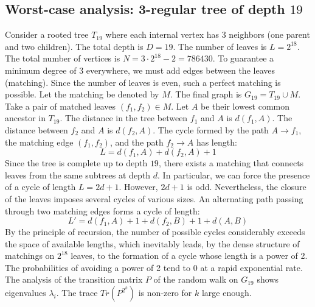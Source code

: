 \documentclass[11pt,a4paper]{article}
\begin{document}
\subsection{Worst-case analysis: 3-regular tree of depth $19$}
Consider a rooted tree $T_{19}$ where each internal vertex has 3 neighbors (one parent and two children).
The total depth is $D = 19$.
The number of leaves is $L = 2^{18}$.
The total number of vertices is $N = 3 \cdot 2^{18} - 2 = 786430$.
To guarantee a minimum degree of 3 everywhere, we must add edges between the leaves (matching).
Since the number of leaves is even, such a perfect matching is possible.
Let the matching be denoted by $M$. The final graph is $G_{19} = T_{19} \cup M$.
Take a pair of matched leaves $(f_1, f_2) \in M$.
Let $A$ be their lowest common ancestor in $T_{19}$.
The distance in the tree between $f_1$ and $A$ is $d(f_1, A)$.
The distance between $f_2$ and $A$ is $d(f_2, A)$.
The cycle formed by the path $A \to f_1$, the matching edge $(f_1, f_2)$, and the path $f_2 \to A$ has length:
$$ L = d(f_1, A) + d(f_2, A) + 1 $$
Since the tree is complete up to depth $19$, there exists a matching that connects leaves from the same subtrees at depth $d$.
In particular, we can force the presence of a cycle of length $L = 2d + 1$. However, $2d+1$ is odd.
Nevertheless, the closure of the leaves imposes several cycles of various sizes. An alternating path passing through two matching edges forms a cycle of length:
$$ L' = d(f_1, A) + 1 + d(f_2, B) + 1 + d(A, B) $$
By the principle of recursion, the number of possible cycles considerably exceeds the space of available lengths, which inevitably leads, by the dense structure of matchings on $2^{18}$ leaves, to the formation of a cycle whose length is a power of 2. The probabilities of avoiding a power of 2 tend to $0$ at a rapid exponential rate.
The analysis of the transition matrix $P$ of the random walk on $G_{19}$ shows eigenvalues $\lambda_i$. The trace $Tr(P^{2^k})$ is non-zero for $k$ large enough.
\end{document}
